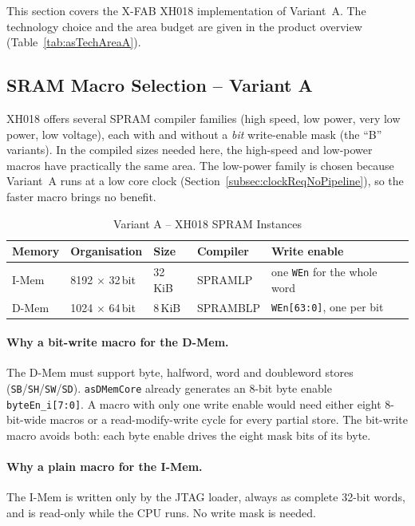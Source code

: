 This section covers the X-FAB XH018 implementation of Variant~A.
The technology choice and the area budget are given in the product overview
(Table~\ref{tab:asTechAreaA}).

\subsection{SRAM Macro Selection -- Variant A}
\label{subsec:sramSelectionA}

XH018 offers several SPRAM compiler families (high speed, low power, very low
power, low voltage), each with and without a \emph{bit} write-enable mask
(the ``B'' variants).
In the compiled sizes needed here, the high-speed and low-power macros have
practically the same area. The low-power family is chosen because
Variant~A runs at a low core clock
(Section~\ref{subsec:clockReqNoPipeline}), so the faster macro brings no benefit.

\begin{table}[H]
\caption{Variant A -- XH018 SPRAM Instances}
\label{tab:asSramInstancesA}
\centering
\begin{tabularx}{\textwidth}{|l |l |l |l |X|}
  \hline
  Memory & Organisation & Size & Compiler & Write enable \\
  \hline
  \hline
  I-Mem & 8192 $\times$ 32\,bit & 32\,KiB & SPRAMLP  & one \texttt{WEn} for the whole word \\
  \hline
  D-Mem & 1024 $\times$ 64\,bit & 8\,KiB  & SPRAMBLP & \texttt{WEn[63:0]}, one per bit \\
  \hline
\end{tabularx}
\end{table}

\paragraph{Why a bit-write macro for the D-Mem.}
The D-Mem must support byte, halfword, word and doubleword stores
(\texttt{SB}/\texttt{SH}/\texttt{SW}/\texttt{SD}). \texttt{asDMemCore} already
generates an 8-bit byte enable \texttt{byteEn\_i[7:0]}.
A macro with only one write enable would need either eight 8-bit-wide macros
or a read-modify-write cycle for every partial store.
The bit-write macro avoids both: each byte enable drives the eight mask bits
of its byte.

\paragraph{Why a plain macro for the I-Mem.}
The I-Mem is written only by the JTAG loader, always as complete 32-bit
words, and is read-only while the CPU runs. No write mask is needed.

